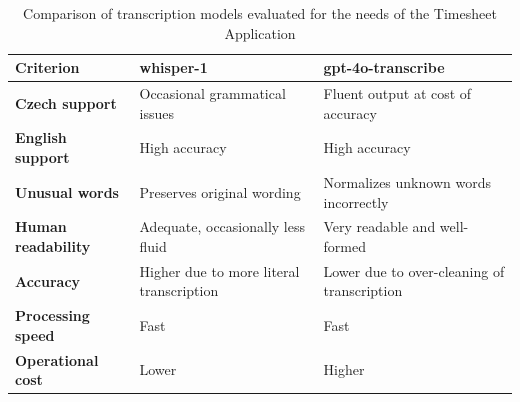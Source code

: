 \documentclass[
  digital,     %
  oneside,     %
  nosansbold,  %
  nocolorbold, %
  lof,         %
  lot,         %
]{fithesis4}
\begin{document}
\begin{table}[H]
\centering
\begin{tabularx}{\textwidth}{|X|X|X|}
\hline
\textbf{Criterion} & \textbf{whisper-1} & \textbf{gpt-4o-transcribe} \\
\hline
\textbf{Czech support} & Occasional grammatical issues & Fluent output at cost of accuracy \\
\hline
\textbf{English support} & High accuracy & High accuracy \\
\hline
\textbf{Unusual words} & Preserves original wording & Normalizes unknown words incorrectly \\
\hline
\textbf{Human readability} & Adequate, occasionally less fluid & Very readable and well-formed \\
\hline
\textbf{Accuracy} & Higher due to more literal transcription & Lower due to over-cleaning of transcription \\
\hline
\textbf{Processing speed} & Fast & Fast \\
\hline
\textbf{Operational cost} & Lower & Higher \\
\hline
\end{tabularx}
\caption{Comparison of transcription models evaluated for the needs of the Timesheet Application}
\label{tab:transcription_models}
\end{table}
\end{document}
